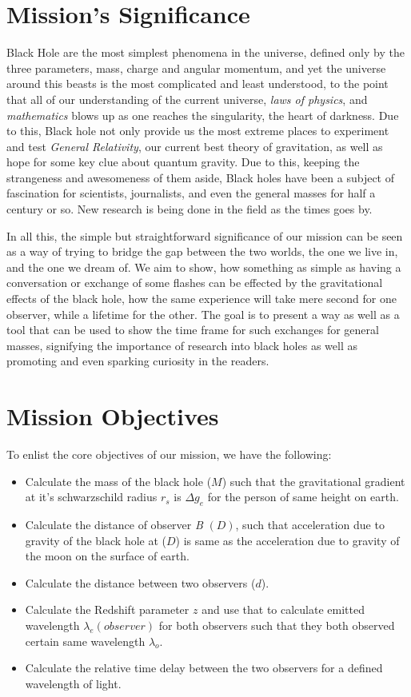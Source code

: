 \section{Mission's Significance}\label{sec:significance}

Black Hole are the most simplest phenomena in the universe, defined only by the three parameters, mass, charge and angular momentum, and 
yet the universe around this beasts is the most complicated and least understood, to the point that all of our understanding of the current universe, \emph{laws of physics},
and \emph{mathematics} blows up as one reaches the singularity, the heart of darkness. Due to this, Black hole not only provide us the most extreme places to experiment and 
test \emph{General Relativity}, our current best theory of gravitation, as well as hope for some key clue about quantum gravity. Due to this, keeping the 
strangeness and awesomeness of them aside, Black holes have been a subject of fascination for scientists, journalists, and even the general masses 
for half a century or so. New research is being done in the field as the times goes by. 

In all this, the simple but straightforward significance of our mission can be seen as a way of trying to bridge the gap between the two worlds, the one 
we live in, and the one we dream of. We aim to show, how something as simple as having a conversation or exchange of some flashes can be effected 
by the gravitational effects of the black hole, how the same experience will take mere second for one observer, while a lifetime for the other. The goal is to
present a way as well as a tool that can be used to show the time frame for such exchanges for general masses, signifying the importance of 
research into black holes as well as promoting and even sparking curiosity in the readers.

\section{Mission Objectives}\label{sec:objectives}

To enlist the core objectives of our mission, we have the following:

\begin{itemize}
    \item Calculate the mass of the black hole (\(M\)) such that the gravitational gradient at  it's schwarzschild radius \(r_s\) is \(\Delta g_e\) for the person of same height on earth.
    \item Calculate the distance of observer \emph{B} \((D)\), such that acceleration due to gravity of the black hole at (\(D\)) is same as the acceleration due to gravity of the moon on the surface of earth.
    \item Calculate the distance between two observers (\(d\)).
    \item Calculate the Redshift parameter \(z\) and use that to calculate emitted wavelength \(\lambda_e(observer)\) for both observers such that they both observed certain same wavelength \(\lambda_o\).
    \item Calculate the relative time delay between the two observers for a defined wavelength of light.
\end{itemize}

